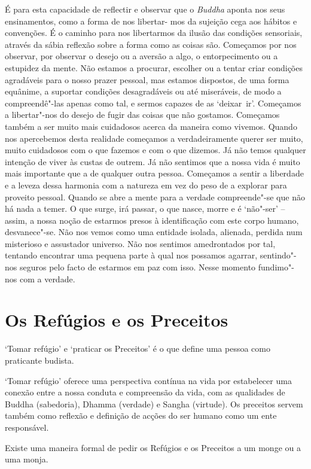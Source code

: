 É para esta capacidade de reflectir e observar que o \emph{Buddha}
aponta nos seus ensinamentos, como a forma de nos libertar- mos da
sujeição cega aos hábitos e convenções. É o caminho para nos libertarmos
da ilusão das condições sensoriais, através da sábia reflexão sobre a forma
como as coisas são. Começamos por nos observar, por observar o desejo ou
a aversão a algo, o entorpecimento ou a estupidez da mente. Não
estamos a procurar, escolher ou a tentar criar condições agradáveis para
o nosso prazer pessoal, mas estamos dispostos, de uma forma equânime,
a suportar condições desagradáveis ou até miseráveis, de modo a
compreendê"-las apenas como tal, e sermos capazes de as `deixar~ir'.
\mbox{Começamos} a libertar"-nos do desejo de fugir das coisas que não gostamos.
Começamos também a ser muito mais cuidadosos acerca da maneira como
vivemos. Quando nos apercebemos desta realidade começamos a
verdadeiramente querer ser muito, muito cuidadosos com o que fazemos e
com o que dizemos. Já não temos qualquer intenção de viver às custas de
outrem. Já não sentimos que a nossa vida é muito mais importante que a
de qualquer outra pessoa. Começamos a sentir a liberdade e a leveza
dessa harmonia com a natureza em vez do peso de a explorar para proveito
pessoal. Quando se abre a mente para a verdade compreende"-se que não há
nada a temer. O que surge, irá passar, o que nasce, morre e é `não"-ser'
-- assim, a nossa noção de estarmos presos à identificação com este
corpo humano, desvanece"-se. Não nos vemos como uma entidade isolada,
alienada, perdida num misterioso e assustador universo. Não nos sentimos
amedrontados por tal, tentando encontrar uma pequena parte à qual nos
possamos agarrar, sentindo"-nos seguros pelo facto de estarmos em paz com
isso. Nesse momento fundimo"-nos com a verdade.

\chapter{Os Refúgios e os Preceitos}

`Tomar refúgio' e `praticar os Preceitos' é o que define uma
pessoa como praticante budista.

`Tomar refúgio' oferece uma perspectiva contínua na vida por estabelecer
uma conexão entre a nossa conduta e compreensão da vida, com as
qualidades de Buddha (sabedoria), Dhamma (verdade) e Sangha (virtude).
Os preceitos servem também como reflexão e definição de acções do ser
humano como um ente responsável.

Existe uma maneira formal de pedir os Refúgios e os Preceitos a um monge
ou a uma monja.

